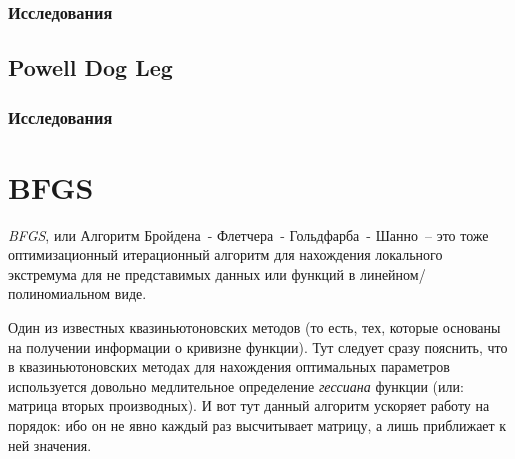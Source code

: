 \documentclass[12pt, a4paper, oneside, final]{article}
\begin{document}
	\subsubsection*{Исследования}
	\subsection*{Powell Dog Leg}
	\subsubsection*{Исследования}
	\newpage
	\section*{BFGS}
	\textit{BFGS}, или Алгоритм Бройдена~- Флетчера~- Гольдфарба~- Шанно~-- это тоже оптимизационный итерационный алгоритм для нахождения локального экстремума для не представимых данных или функций в линейном/полиномиальном виде.

	Один из известных квазиньютоновских методов (то есть, тех, которые основаны на получении информации о кривизне функции).
	Тут следует сразу пояснить, что в квазиньютоновских методах для нахождения оптимальных параметров используется довольно медлительное определение \textit{гессиана} функции (или: матрица вторых производных).
	И вот тут данный алгоритм ускоряет работу на порядок: ибо он не явно каждый раз высчитывает матрицу, а лишь приближает к ней значения.
\end{document}
